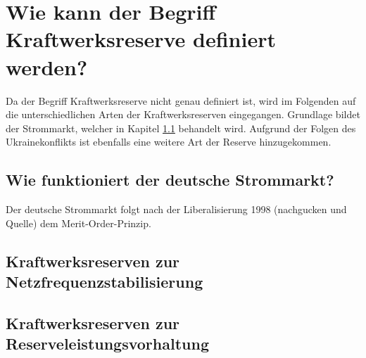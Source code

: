 \section{Wie kann der Begriff Kraftwerksreserve definiert werden?}

	Da der Begriff Kraftwerksreserve nicht genau definiert ist, wird im Folgenden auf die unterschiedlichen Arten der Kraftwerksreserven eingegangen.
	Grundlage bildet der Strommarkt, welcher in Kapitel \ref{sect: Wie funktioniert der deutsche Strommarkt?} behandelt wird.
	Aufgrund der Folgen des Ukrainekonflikts ist ebenfalls eine weitere Art der Reserve hinzugekommen.

	\subsection{Wie funktioniert der deutsche Strommarkt?} \label{sect: Wie funktioniert der deutsche Strommarkt?}
	
		Der deutsche Strommarkt folgt nach der Liberalisierung 1998 (nachgucken und Quelle) dem Merit-Order-Prinzip.
		
	
	\subsection{Kraftwerksreserven zur Netzfrequenzstabilisierung}
	
		
	
	\subsection{Kraftwerksreserven zur Reserveleistungsvorhaltung}